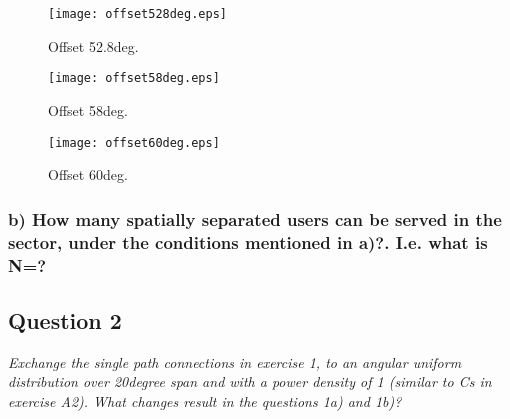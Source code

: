 \begin{figure}[!h]
  \centering
  \texttt{[image: offset528deg.eps]}
  \caption{Offset 52.8deg.}
  \label{fig:offset528deg}
\end{figure}

\begin{figure}[!h]
  \centering
  \texttt{[image: offset58deg.eps]}
  \caption{Offset 58deg.}
  \label{fig:offset58deg}
\end{figure}

\begin{figure}[!h]
  \centering
  \texttt{[image: offset60deg.eps]}
  \caption{Offset 60deg.}
  \label{fig:offset60deg}
\end{figure}

\subsubsection{b) How many spatially separated users can be served in the sector, under the conditions mentioned in a)?. I.e. what is N=?}


\subsection{Question 2}
\textit{Exchange the single path connections in exercise 1, to an angular uniform distribution over 20degree span and with a power density of 1 (similar to Cs in exercise A2). What changes result in the questions 1a) and 1b)?}
